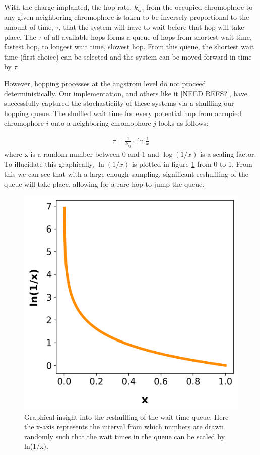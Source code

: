 With the charge implanted, the hop rate, $k_{ij}$, from the occupied chromophore to any
given neighboring chromophore is taken to be
inversely proportional to the amount of time, $\tau$, that the system will have to wait before that hop will
take place. The $\tau$ of all available hops forms a queue of hops from shortest wait time, fastest hop, to
longest wait time, slowest hop. From this queue, the shortest wait time (first choice) can be selected
and the system can be moved forward in time by $\tau$.

However, hopping processes at the angstrom level do not proceed deterministically. 
Our implementation, and others like it [NEED REFS?], have
successfully captured the stochasticiity of these systems via a shuffling our hopping queue.
The shuffled wait time for every potential hop from occupied chromophore $i$ onto a
neighboring chromophore $j$ looks as follows:

\begin{align}
    \tau = \frac{1}{k_{ij}} \cdot \ln{\frac{1}{x}} 
\end{align}
where x is a random number between 0 and 1 and $\log{(1/x)}$ is a scaling factor. To illucidate this
graphically, $\ln{(1/x)}$ is plotted in figure \ref{fig:ln} from 0 to 1. From this we can see that with
a large enough sampling, significant reshuffling of the queue will take place, allowing for a rare hop to jump
the queue.

\begin{figure}
  \center
  \includegraphics[width=0.8\linewidth]{figures/naturallog.png}
  \caption{Graphical insight into the reshuffling of the wait time queue. Here the x-axis represents the 
    interval from which numbers are drawn randomly such that the wait times in the queue can be scaled 
    by ln(1/x).}
  \label{fig:ln}
\end{figure}

